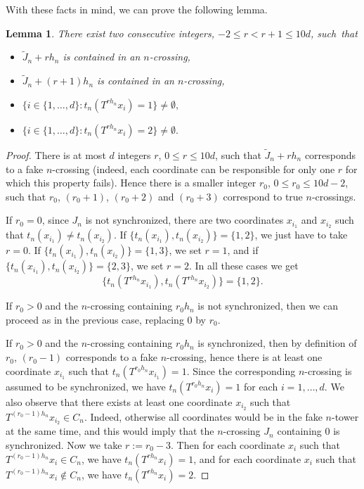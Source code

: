 \documentclass[10pt]{amsart}
\newtheorem{lemm}[theo]{Lemma}\newtheorem{prop}[theo]{Proposition}\newtheorem{coro}[theo]{Corollary}\newtheorem{conj}[theo]{Conjecture}
\theoremstyle{definition}\newtheorem{defi}[theo]{Definition}\newtheorem{rema}[theo]{Remark}\newtheorem{exam}[theo]{Example}\newtheorem{exem}[theo]{Example}\newtheorem{nota}[theo]{Notation}
\newcommand{\egdef}{:=}
\begin{document}
With these facts in mind, we can prove the following lemma.

\begin{lemm}\label{lemma:thirdcase}
There exist two consecutive integers, $-2\le r<r+1\le 10d$, such~that
\begin{itemize}
\item $\tilde J_n+rh_n$ is contained in an $n$-crossing,
\item $\tilde J_n+(r+1)h_n$ is contained in an $n$-crossing,
\item $\bigl\{i\in\{1,\ldots,d\}:t_n(T^{rh_n}x_i)=1\bigr\}\neq\emptyset,$
\item $\bigl\{i\in\{1,\ldots,d\}:t_n(T^{rh_n}x_i)=2\bigr\}\neq\emptyset.$
\end{itemize}
\end{lemm}

\begin{proof}
There is at most $d$ integers $r$, $0\le r\le 10d$, such that $\tilde J_n+rh_n$ corresponds to a fake $n$-crossing (indeed, each coordinate can be responsible for only one $r$ for which this property fails). Hence there is a smaller integer $r_0$, $0\le r_0\le 10d-2$, such that $r_0$, $(r_0+1)$, $(r_0+2)$ and $(r_0+3)$ correspond to true $n$-crossings.

If $r_0=0$, since $J_n$ is not synchronized, there are two coordinates $x_{i_1}$ and $x_{i_2}$ such that $t_n(x_{i_1})\neq t_n(x_{i_2})$. If $\{t_n(x_{i_1}),t_n(x_{i_2})\}=\{1,2\}$, we just have to take $r=0$. If $\{t_n(x_{i_1}),t_n(x_{i_2})\}=\{1,3\}$, we set $r=1$, and if $\{t_n(x_{i_1}),t_n(x_{i_2})\}=\{2,3\}$, we set $r=2$. In all these cases we get
\[
\{t_n(T^{rh_n}x_{i_1}),t_n(T^{rh_n}x_{i_2})\}=\{1,2\}.
\]

If $r_0>0$ and the $n$-crossing containing $r_0h_n$ is not synchronized, then we can proceed as in the previous case, replacing 0 by $r_0$.

If $r_0>0$ and the $n$-crossing containing $r_0h_n$ is synchronized, then by definition of $r_0$, $(r_0-1)$ corresponds to a fake $n$-crossing, hence there is at least one coordinate $x_{i_1}$ such that $t_n(T^{r_0h_n}x_{i_1})=1$. Since the corresponding $n$-crossing is assumed to be synchronized, we have $t_n(T^{r_0h_n}x_{i})=1$ for each $i=1,\ldots,d$. We also observe that there exists at least one coordinate $x_{i_2}$ such that $T^{(r_0-1)h_n}x_{i_2}\in C_n$. Indeed, otherwise all coordinates would be in the fake $n$-tower at the same time, and this would imply that the $n$-crossing $J_n$ containing 0 is synchronized. Now we take $r\egdef r_0-3$. Then for each coordinate $x_i$ such that $T^{(r_0-1)h_n}x_{i}\in C_n$, we have $t_n(T^{rh_n}x_{i})=1$, and for each coordinate $x_i$ such that $T^{(r_0-1)h_n}x_{i}\notin C_n$, we have $t_n(T^{rh_n}x_{i})=2$.
\end{proof}
\end{document}
